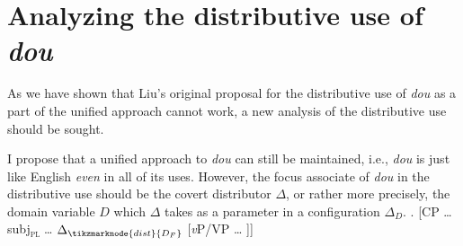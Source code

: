 \documentclass[12pt]{article}
\let\latextextsubscript\textsubscript
\let\textsubscript\latextextsubscript
\newcommand{\sub}[1]{\textsubscript{#1}}
\begin{document}
\section{Analyzing the distributive use of \emph{dou}}
\label{sec:analyzing_the_distributive_use_of_dou}


As we have shown that Liu's original proposal for the distributive use of \emph{dou} as a part of the unified approach cannot work, a new analysis of the distributive use should be sought.

I propose that a unified approach to \emph{dou} can still be maintained, i.e., \emph{dou} is just like English \emph{even} in all of its uses. 
However, the focus associate of \emph{dou} in the distributive use should be the covert distributor \(\Delta\), or rather more precisely, the domain variable \(D\) which \(\Delta\) takes as a parameter in a configuration \(\Delta_D\).
\exi. [CP \ldots{} subj\sub{\textsc{pl}} \ldots{} \(\Delta_{\tikzmarknode{dist}{D_F}}\)   [\emph{v}P/VP \ldots{} ]]
\end{document}
